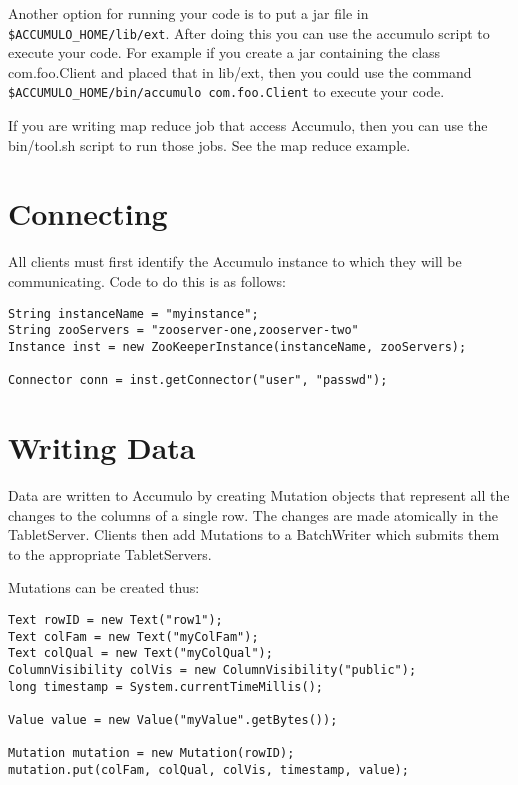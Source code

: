 Another option for running your code is to put a jar file in
\texttt{\$ACCUMULO\_HOME/lib/ext}.  After doing this you can use the accumulo
script to execute your code.  For example if you create a jar containing the
class com.foo.Client and placed that in lib/ext, then you could use the command
\texttt{\$ACCUMULO\_HOME/bin/accumulo com.foo.Client} to execute your code.

If you are writing map reduce job that access Accumulo, then you can use the
bin/tool.sh script to run those jobs.  See the map reduce example.

\section{Connecting}

All clients must first identify the Accumulo instance to which they will be
communicating. Code to do this is as follows:

\small
\begin{verbatim}
String instanceName = "myinstance";
String zooServers = "zooserver-one,zooserver-two"
Instance inst = new ZooKeeperInstance(instanceName, zooServers);

Connector conn = inst.getConnector("user", "passwd");
\end{verbatim}
\normalsize

\section{Writing Data}

Data are written to Accumulo by creating Mutation objects that represent all the
changes to the columns of a single row. The changes are made atomically in the
TabletServer. Clients then add Mutations to a BatchWriter which submits them to
the appropriate TabletServers.

Mutations can be created thus:

\small
\begin{verbatim}
Text rowID = new Text("row1");
Text colFam = new Text("myColFam");
Text colQual = new Text("myColQual");
ColumnVisibility colVis = new ColumnVisibility("public");
long timestamp = System.currentTimeMillis();

Value value = new Value("myValue".getBytes());

Mutation mutation = new Mutation(rowID);
mutation.put(colFam, colQual, colVis, timestamp, value);
\end{verbatim}
\normalsize

